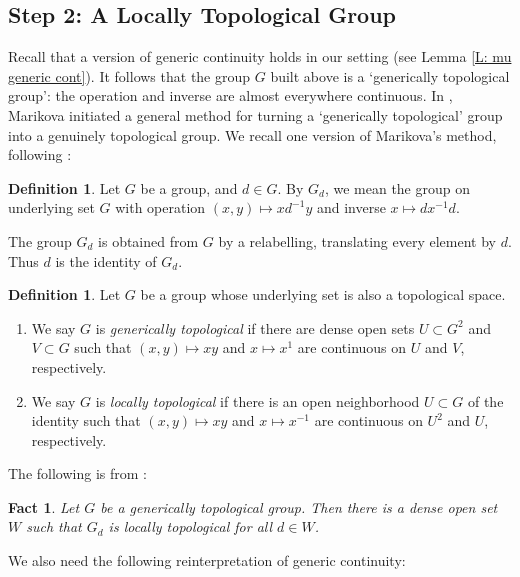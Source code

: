 \documentclass{amsart}
\newtheorem{fact}[theorem]{Fact}
\theoremstyle{definition}
\newtheorem{definition}[theorem]{Definition}
\begin{document}
    \subsection{Step 2: A Locally Topological Group}

    Recall that a version of generic continuity holds in our setting (see Lemma \ref{L: mu generic cont}). It follows that the group $G$ built above is a `generically topological group': the operation and inverse are almost everywhere continuous. In \cite{MarikovaGps}, Marikova initiated a general method for turning a `generically topological' group into a genuinely topological group. We recall one version of Marikova's method, following \cite{CasHasTconv}:

    \begin{definition}\label{D: G_d}
        Let $G$ be a group, and $d\in G$. By $G_d$, we mean the group on underlying set $G$ with operation $(x,y)\mapsto xd^{-1}y$ and inverse $x\mapsto dx^{-1}d$. 
    \end{definition}

    The group $G_d$ is obtained from $G$ by a relabelling, translating every element by $d$. Thus $d$ is the identity of $G_d$.

    \begin{definition}
        Let $G$ be a group whose underlying set is also a topological space.
        \begin{enumerate}
            \item We say $G$ is \textit{generically topological} if there are dense open sets $U\subset G^2$ and $V\subset G$ such that $(x,y)\mapsto xy$ and $x\mapsto x^{1}$ are continuous on $U$ and $V$, respectively.
            \item We say $G$ is \textit{locally topological} if there is an open neighborhood $U\subset G$ of the identity such that $(x,y)\mapsto xy$ and $x\mapsto x^{-1}$ are continuous on $U^2$ and $U$, respectively.
        \end{enumerate}
    \end{definition}
The following is from \cite[\S 7]{CasHasTconv}:
    \begin{fact}\label{F: marikova}
        Let $G$ be a generically topological group. Then there is a dense open set $W$ such that $G_d$ is locally topological for all $d\in W$. 
    \end{fact}

We also need the following reinterpretation of generic continuity:
\end{document}

